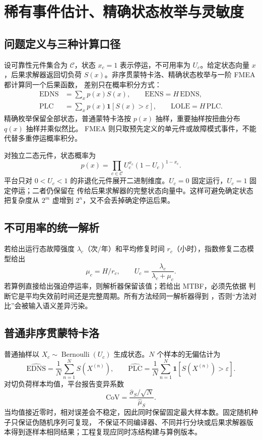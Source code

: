 \section{稀有事件估计、精确状态枚举与灵敏度}\label{sec:rel-exact}

\subsection{问题定义与三种计算口径}
设可靠性元件集合为 $\mathcal C$，状态 $x_c=1$ 表示停运，不可用率为 $U_c$。给定状态向量
$x$，后果求解器返回切负荷 $S(x)$。非序贯蒙特卡洛、精确状态枚举与一阶 FMEA 都计算同一个后果函数，
差别只在概率积分方式：
\begin{align}
 \mathrm{EDNS}&=\sum_x p(x)S(x),\qquad
 \mathrm{EENS}=H\,\mathrm{EDNS},\\
 \mathrm{PLC}&=\sum_xp(x)\mathbf 1[S(x)>\varepsilon],
 \qquad \mathrm{LOLE}=H\,\mathrm{PLC}.
\end{align}
精确枚举保留全部状态，普通蒙特卡洛按 $p(x)$ 抽样，重要抽样按扭曲分布 $q(x)$ 抽样并乘似然比。
FMEA 则只取预先定义的单元件或故障模式事件，不能代替多重停运概率积分。

对独立二态元件，状态概率为
\begin{equation}
 p(x)=\prod_{c\in\mathcal C}U_c^{x_c}(1-U_c)^{1-x_c}.
 \label{eq:rel-exact-state-probability}
\end{equation}
平台只对 $0<U_c<1$ 的非退化元件展开二进制维度。$U_c=0$ 固定运行，$U_c=1$ 固定停运；二者仍保留在
传给后果求解器的完整状态向量中。这样可避免确定状态把复杂度从 $2^m$ 虚增到 $2^n$，又不会丢掉确定停运后果。

\subsection{不可用率的统一解析}
若给出运行态故障强度 $\lambda_c$（次/年）和平均修复时间 $r_c$（小时），指数修复二态模型给出
\begin{equation}
 \mu_c=H/r_c,\qquad U_c=\frac{\lambda_c}{\lambda_c+\mu_c}.
\end{equation}
若算例直接给出强迫停运率，则解析器保留该值；若给出 MTBF，必须先依据
 判断它是平均失效前时间还是完整周期。所有方法经同一解析器得到
，否则“方法对比”会被输入语义差异污染。

\subsection{普通非序贯蒙特卡洛}
普通抽样以 $X_c\sim\operatorname{Bernoulli}(U_c)$ 生成状态。$N$ 个样本的无偏估计为
\begin{equation}
 \widehat{\mathrm{EDNS}}=\frac1N\sum_{n=1}^NS(X^{(n)}),\qquad
 \widehat{\mathrm{PLC}}=\frac1N\sum_{n=1}^N\mathbf 1[S(X^{(n)})>\varepsilon].
\end{equation}
对切负荷样本均值，平台报告变异系数
\begin{equation}
 \mathrm{CoV}=\frac{\widehat\sigma_S/\sqrt N}{\widehat\mu_S}.
\end{equation}
当均值接近零时，相对误差会不稳定，因此同时保留固定最大样本数。固定随机种子只保证伪随机序列可复现，
不保证不同编译器、不同并行分块或后果求解器版本得到逐样本相同结果；工程复现应同时冻结构建与算例版本。

